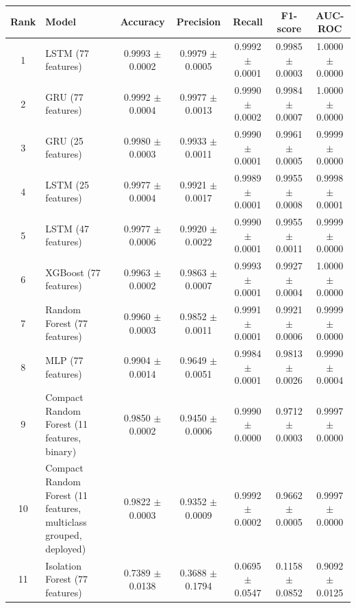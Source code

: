 \begin{tabular}{clccccc}
\toprule
\textbf{Rank} & \textbf{Model} & \textbf{Accuracy} & \textbf{Precision} & \textbf{Recall} & \textbf{F1-score} & \textbf{AUC-ROC}\\
\midrule
1 & LSTM (77 features) & 0.9993 $\pm$ 0.0002 & 0.9979 $\pm$ 0.0005 & 0.9992 $\pm$ 0.0001 & 0.9985 $\pm$ 0.0003 & 1.0000 $\pm$ 0.0000\\
2 & GRU (77 features) & 0.9992 $\pm$ 0.0004 & 0.9977 $\pm$ 0.0013 & 0.9990 $\pm$ 0.0002 & 0.9984 $\pm$ 0.0007 & 1.0000 $\pm$ 0.0000\\
3 & GRU (25 features) & 0.9980 $\pm$ 0.0003 & 0.9933 $\pm$ 0.0011 & 0.9990 $\pm$ 0.0001 & 0.9961 $\pm$ 0.0005 & 0.9999 $\pm$ 0.0000\\
4 & LSTM (25 features) & 0.9977 $\pm$ 0.0004 & 0.9921 $\pm$ 0.0017 & 0.9989 $\pm$ 0.0001 & 0.9955 $\pm$ 0.0008 & 0.9998 $\pm$ 0.0001\\
5 & LSTM (47 features) & 0.9977 $\pm$ 0.0006 & 0.9920 $\pm$ 0.0022 & 0.9990 $\pm$ 0.0001 & 0.9955 $\pm$ 0.0011 & 0.9999 $\pm$ 0.0000\\
6 & XGBoost (77 features) & 0.9963 $\pm$ 0.0002 & 0.9863 $\pm$ 0.0007 & 0.9993 $\pm$ 0.0001 & 0.9927 $\pm$ 0.0004 & 1.0000 $\pm$ 0.0000\\
7 & Random Forest (77 features) & 0.9960 $\pm$ 0.0003 & 0.9852 $\pm$ 0.0011 & 0.9991 $\pm$ 0.0001 & 0.9921 $\pm$ 0.0006 & 0.9999 $\pm$ 0.0000\\
8 & MLP (77 features) & 0.9904 $\pm$ 0.0014 & 0.9649 $\pm$ 0.0051 & 0.9984 $\pm$ 0.0001 & 0.9813 $\pm$ 0.0026 & 0.9990 $\pm$ 0.0004\\
9 & Compact Random Forest (11 features, binary) & 0.9850 $\pm$ 0.0002 & 0.9450 $\pm$ 0.0006 & 0.9990 $\pm$ 0.0000 & 0.9712 $\pm$ 0.0003 & 0.9997 $\pm$ 0.0000\\
10 & Compact Random Forest (11 features, multiclass grouped, deployed) & 0.9822 $\pm$ 0.0003 & 0.9352 $\pm$ 0.0009 & 0.9992 $\pm$ 0.0002 & 0.9662 $\pm$ 0.0005 & 0.9997 $\pm$ 0.0000\\
11 & Isolation Forest (77 features) & 0.7389 $\pm$ 0.0138 & 0.3688 $\pm$ 0.1794 & 0.0695 $\pm$ 0.0547 & 0.1158 $\pm$ 0.0852 & 0.9092 $\pm$ 0.0125\\
\bottomrule
\end{tabular}
